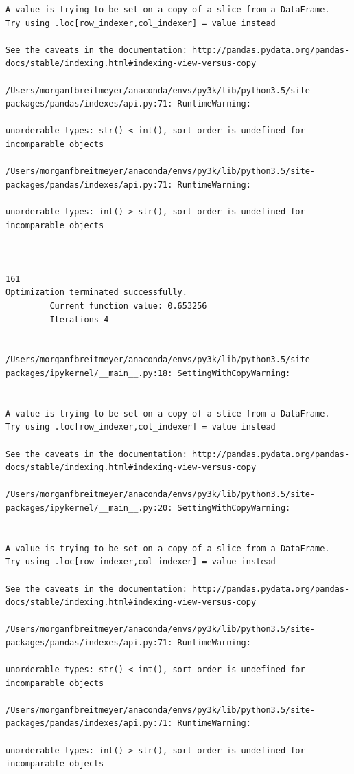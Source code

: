 \begin{lstlisting}
A value is trying to be set on a copy of a slice from a DataFrame.
Try using .loc[row_indexer,col_indexer] = value instead

See the caveats in the documentation: http://pandas.pydata.org/pandas-docs/stable/indexing.html#indexing-view-versus-copy

/Users/morganfbreitmeyer/anaconda/envs/py3k/lib/python3.5/site-packages/pandas/indexes/api.py:71: RuntimeWarning:

unorderable types: str() < int(), sort order is undefined for incomparable objects

/Users/morganfbreitmeyer/anaconda/envs/py3k/lib/python3.5/site-packages/pandas/indexes/api.py:71: RuntimeWarning:

unorderable types: int() > str(), sort order is undefined for incomparable objects



161
Optimization terminated successfully.
         Current function value: 0.653256
         Iterations 4


/Users/morganfbreitmeyer/anaconda/envs/py3k/lib/python3.5/site-packages/ipykernel/__main__.py:18: SettingWithCopyWarning:


A value is trying to be set on a copy of a slice from a DataFrame.
Try using .loc[row_indexer,col_indexer] = value instead

See the caveats in the documentation: http://pandas.pydata.org/pandas-docs/stable/indexing.html#indexing-view-versus-copy

/Users/morganfbreitmeyer/anaconda/envs/py3k/lib/python3.5/site-packages/ipykernel/__main__.py:20: SettingWithCopyWarning:


A value is trying to be set on a copy of a slice from a DataFrame.
Try using .loc[row_indexer,col_indexer] = value instead

See the caveats in the documentation: http://pandas.pydata.org/pandas-docs/stable/indexing.html#indexing-view-versus-copy

/Users/morganfbreitmeyer/anaconda/envs/py3k/lib/python3.5/site-packages/pandas/indexes/api.py:71: RuntimeWarning:

unorderable types: str() < int(), sort order is undefined for incomparable objects

/Users/morganfbreitmeyer/anaconda/envs/py3k/lib/python3.5/site-packages/pandas/indexes/api.py:71: RuntimeWarning:

unorderable types: int() > str(), sort order is undefined for incomparable objects




\end{lstlisting}
